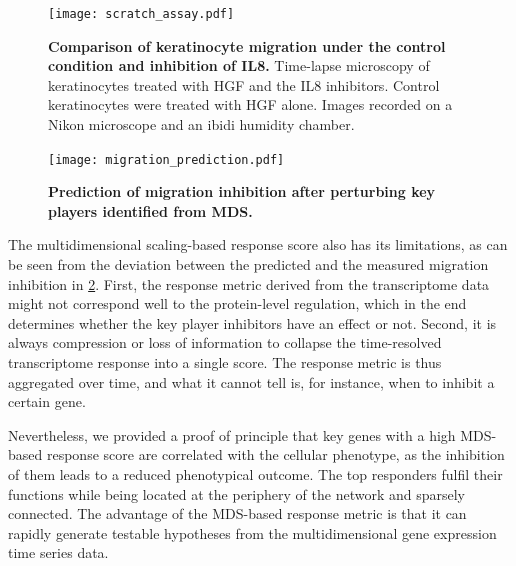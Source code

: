 \begin{figure}[!ht]
\begin{center}
\texttt{[image: scratch\_assay.pdf]}
\end{center}
\caption[Migration of keratinocytes]{
{\bf Comparison of keratinocyte migration under the control condition and 
inhibition of IL8.}
Time-lapse microscopy of keratinocytes treated with HGF and the IL8 inhibitors. 
Control keratinocytes were treated with HGF alone. Images recorded on a Nikon 
microscope and an ibidi humidity chamber.
}
\label{fig:scratch_assay}
\end{figure}

\begin{figure}[!ht]
\begin{center}
\texttt{[image: migration\_prediction.pdf]}
\end{center}
\caption[Prediction of migration inhibition after perturbing key players]{
{\bf Prediction of migration inhibition after perturbing key players identified
from MDS.} 
}
\label{fig:migration_prediction}
\end{figure}

The multidimensional scaling-based response score also has
its limitations, as can be seen from the deviation between
the predicted and the measured migration inhibition in 
\ref{fig:migration_prediction}. First, the response metric
derived from the transcriptome data might not correspond
well to the protein-level regulation, which in the end 
determines whether the key player inhibitors have an effect
or not. Second, it is always compression or loss of information
to collapse the time-resolved transcriptome response into
a single score. The response metric is thus aggregated over
time, and what it cannot tell is, for instance, when to 
inhibit a certain gene.

Nevertheless, we provided a proof of principle that key genes with a high MDS-based response
score are correlated with the cellular phenotype, as the inhibition of them
leads to a reduced phenotypical outcome.
The top responders fulfil their functions
while being located at the periphery of the network and sparsely connected.
The advantage of the MDS-based response metric is that it can rapidly generate
testable hypotheses from the multidimensional gene expression time series data.

